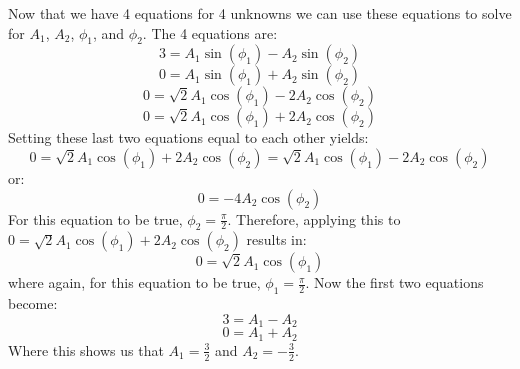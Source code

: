 \documentclass[12pt,letter]{article}
\begin{document}
\begin{example}
\begin{equation}
	\end{equation}
	Now that we have 4 equations for 4 unknowns we can use these equations to solve for $A_1$,  $A_2$, $\phi_1$,  and $\phi_2$. The 4 equations are:
	\begin{equation}
	3= A_1 \sin (\phi_1 ) - A_2 \sin (\phi_2)
	\end{equation}
	\begin{equation}
	0= A_1 \sin (\phi_1 ) + A_2 \sin (\phi_2)
	\end{equation}
	\begin{equation}
	0= \sqrt{2}A_1 \cos (\phi_1 ) - 2A_2 \cos (\phi_2)
	\end{equation}
	\begin{equation}
	0= \sqrt{2}A_1 \cos (\phi_1 ) + 2A_2 \cos (\phi_2)
	\end{equation}
	Setting these last two equations equal to each other yields:
	\begin{equation}
	0= \sqrt{2}A_1 \cos (\phi_1 ) + 2A_2 \cos (\phi_2) = \sqrt{2}A_1 \cos (\phi_1 ) - 2A_2 \cos (\phi_2)
	\end{equation}
	or:
	\begin{equation}
	0= - 4A_2 \cos (\phi_2)
	\end{equation}
	For this equation to be true, $\phi_2=\frac{\pi}{2}$. Therefore, applying this to $0= \sqrt{2}A_1 \cos (\phi_1 ) + 2A_2 \cos (\phi_2)$ results in:
	\begin{equation}
	0= \sqrt{2}A_1 \cos (\phi_1 )
	\end{equation}
	where again, for this equation to be true, $\phi_1=\frac{\pi}{2}$. Now the first two equations become:
	\begin{equation}
	3= A_1 - A_2 
	\end{equation}
	\begin{equation}
	0= A_1 + A_2 
	\end{equation}
	Where this shows us that $A_1 = \frac{3}{2}$ and $A_2 = -\frac{3}{2}$. 


\end{example}
\end{document}
